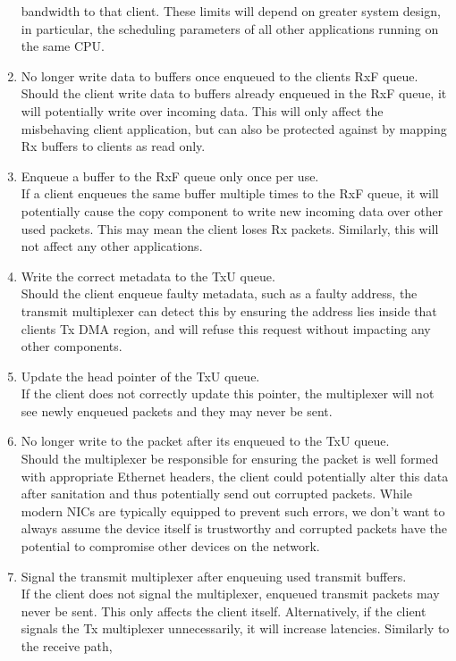 \begin{enumerate}
    bandwidth to that client. These limits
    will depend on greater system design, in particular, the scheduling parameters of all other applications running on the same CPU.
    \item No longer write data to buffers once enqueued to the clients RxF queue.\\
    Should the client write data to buffers already enqueued in the RxF queue, it will potentially write over incoming data. This will only
    affect the misbehaving client application, but can also be protected against by mapping Rx buffers to clients as read only.
    \item Enqueue a buffer to the RxF queue only once per use.\\
    If a client enqueues the same buffer multiple times to the RxF queue, it will potentially cause the copy component to write new incoming
    data over other used packets. This may mean the client loses Rx packets. Similarly, this will not affect any other applications.
    \item Write the correct metadata to the TxU queue.\\
    Should the client enqueue faulty metadata, such as a faulty address, the transmit multiplexer can detect this by ensuring the address lies inside
    that clients Tx DMA region, and will refuse this request without impacting any other components.
    \item Update the head pointer of the TxU queue.\\
    If the client does not correctly update this pointer, the multiplexer will not see newly enqueued packets and they may never be sent.
    \item No longer write to the packet after its enqueued to the TxU queue.\\
    Should the multiplexer be responsible for ensuring the packet is well formed with appropriate Ethernet headers, the client could potentially
    alter this data after sanitation and thus potentially send out corrupted packets. While modern NICs are typically equipped to prevent
    such errors, we don't want to always assume the device itself is trustworthy and corrupted packets have the potential to compromise
    other devices on the network.
    \item Signal the transmit multiplexer after enqueuing used transmit buffers.\\
    If the client does not signal the multiplexer, enqueued transmit packets may never be sent. This only affects the client itself.
    Alternatively, if the client signals the Tx multiplexer unnecessarily, it will increase latencies. Similarly to the receive path,

\end{enumerate}
